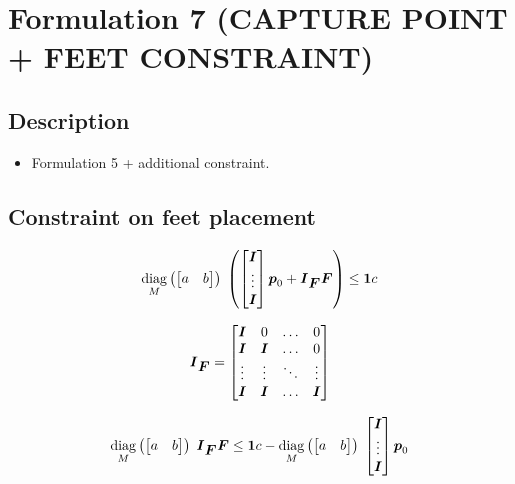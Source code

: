 \section{Formulation 7 (CAPTURE POINT + FEET CONSTRAINT)}\label{sec.form07}


\subsection{Description}
\begin{itemize}
    \item Formulation 5 + additional constraint.
\end{itemize}



\subsection{Constraint on feet placement}

\begin{equation*}
    \underset{M}{\operatorname{diag}}\left(\begin{bmatrix} a & b \end{bmatrix}\right)\;
    \left(
        \begin{bmatrix}
            \mbox{\boldmath $I$} \\
            \vdots \\
            \mbox{\boldmath $I$}\\
        \end{bmatrix} 
        \mbox{\boldmath $p$}_0
        +
        \mbox{\boldmath $I$}_{\mbox{\boldmath $F$}}
        \mbox{\boldmath $F$}
    \right)
    \le
    \mbox{\boldmath $1$} c
\end{equation*}


\begin{equation*}
    \mbox{\boldmath $I$}_{\mbox{\boldmath $F$}} =
    \begin{bmatrix}
        \mbox{\boldmath $I$}   &   0   &  \dots  &   0\\
        \mbox{\boldmath $I$}   & \mbox{\boldmath $I$} &  \dots  &   0\\
        \vdots  & \vdots&  \ddots &  \vdots\\
        \mbox{\boldmath $I$}   & \mbox{\boldmath $I$} &  \dots  &   \mbox{\boldmath $I$}\\
    \end{bmatrix}
\end{equation*}


\begin{equation*}
    \underset{M}{\operatorname{diag}}\left(\begin{bmatrix} a & b \end{bmatrix}\right)\;
    \mbox{\boldmath $I$}_{\mbox{\boldmath $F$}}
    \mbox{\boldmath $F$}
    \le
    \mbox{\boldmath $1$} c -
    \underset{M}{\operatorname{diag}}\left(\begin{bmatrix} a & b \end{bmatrix}\right)\;
    \begin{bmatrix}
        \mbox{\boldmath $I$} \\
        \vdots \\
        \mbox{\boldmath $I$}\\
    \end{bmatrix} 
    \mbox{\boldmath $p$}_0
\end{equation*}


